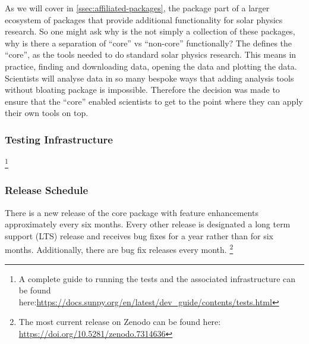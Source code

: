 As we will cover in \autoref{ssec:affiliated-packages}, the \sunpypkg package part of a larger ecosystem of packages that provide additional functionality for solar physics research.
So one might ask why is the \sunpypkg not simply a collection of these packages, why is there a separation of \enquote{core} vs \enquote{non-core} functionally?
The \sunpyproj defines the \enquote{core}, as the tools needed to do standard solar physics research.
This means in practice, finding and downloading data, opening the data and plotting the data.
Scientists will analyse data in so many bespoke ways that adding analysis tools without bloating \sunpypkg package is impossible.
Therefore the decision was made to ensure that the \enquote{core} enabled scientists to get to the point where they can apply their own tools on top.

\subsubsection{Testing Infrastructure}
\label{sssec:testing-infrastructure}

\footnote{A complete guide to running the tests and the associated infrastructure can be found here:\url{https://docs.sunpy.org/en/latest/dev_guide/contents/tests.html}}

\subsubsection{Release Schedule}
\label{sssec:release-schedule}

There is a new release of the core package with feature enhancements approximately every six months.
Every other release is designated a long term support (LTS) release and receives bug fixes for a year rather than for six months.
Additionally, there are bug fix releases every month.
\footnote{The most current release on Zenodo can be found here: \url{https://doi.org/10.5281/zenodo.7314636}}

